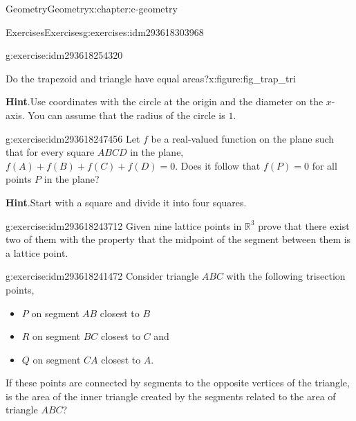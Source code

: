 \documentclass[twoside,10pt,]{book}
\newcommand{\blocktitlefont}{\relax}
\numberwithin{equation}{section}
\begin{document}
\begin{chapterptx}{Geometry}{}{Geometry}{}{}{x:chapter:c-geometry}
\begin{exercises-section}{Exercises}{}{Exercises}{}{}{g:exercises:idm293618303968}
\begin{divisionexercise}{9}{}{}{g:exercise:idm293618254320}
\begin{figureptx}{Do the trapezoid and triangle have equal areas?}{x:figure:fig_trap_tri}{}
\begin{image}{0.2}{0.6}{0.2}
\end{image}%
\tcblower
\end{figureptx}%
\par\smallskip%
\noindent\textbf{\blocktitlefont Hint}.\label{g:hint:idm293618248512}{}\hypertarget{g:hint:idm293618248512}{}\quad{}Use coordinates with the circle at the origin and the diameter on the \(x\)-axis.  You can assume that the radius of the circle is \(1\).%
\end{divisionexercise}%
\begin{divisionexercise}{10}{}{}{g:exercise:idm293618247456}%
Let \(f\) be a real-valued function on the plane such that for every square \(ABCD\) in the plane, \(f(A) + f(B) + f(C) + f(D) = 0\). Does it follow that \(f(P) = 0\) for all points \(P\) in the plane?%
\par\smallskip%
\noindent\textbf{\blocktitlefont Hint}.\label{g:hint:idm293618246656}{}\hypertarget{g:hint:idm293618246656}{}\quad{}Start with a square and divide it into four squares.%
\end{divisionexercise}%
\begin{divisionexercise}{11}{}{}{g:exercise:idm293618243712}%
Given nine lattice points in \(\mathbb{R}^3\) prove that there exist two of them with the property that the midpoint of the segment between them is a lattice point.%
\end{divisionexercise}%
\begin{divisionexercise}{12}{}{}{g:exercise:idm293618241472}%
Consider triangle \(ABC\) with the following trisection points,%
\begin{itemize}[label=\textbullet]
\item{}\(P\) on segment \(AB\) closest to \(B\)%
\item{}\(R\) on segment \(BC\) closest to \(C\) and%
\item{}\(Q\) on segment \(CA\) closest to \(A\).%
\end{itemize}
If these points are connected by segments to the opposite vertices of the triangle, is the area of the inner triangle created by the segments related to the area of triangle \(ABC\)?%
\end{divisionexercise}%
\end{exercises-section}
\end{chapterptx}
%
%
\typeout{************************************************}
\typeout{************************************************}
%
\end{document}

